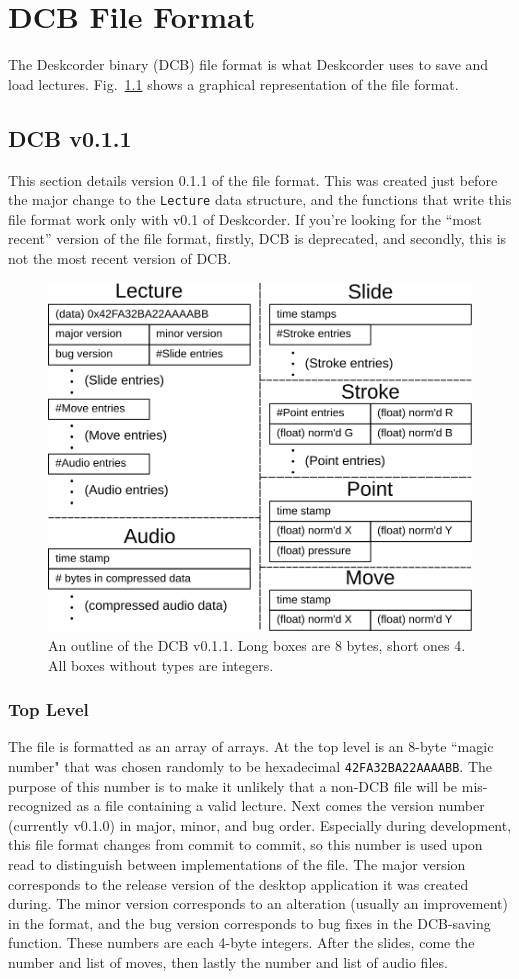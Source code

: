 \chapter{DCB File Format}
The Deskcorder binary (DCB) file format is what Deskcorder uses to save and load lectures.  Fig.~\ref{fig:dcb-ff-v0.1.1} shows a graphical representation of the file format.

\section{DCB v0.1.1}
This section details version 0.1.1 of the file format.  This was created just before the major change to the {\tt Lecture} data structure, and the functions that write this file format work only with v0.1 of Deskcorder.  If you're looking for the ``most recent'' version of the file format, firstly, DCB is deprecated, and secondly, this is not the most recent version of DCB.

\begin{figure}[ht]
  \centering
  \includegraphics[width=.8\columnwidth]{figures/dcb-ff-v0-1-1}
  \caption{An outline of the DCB v0.1.1. Long boxes are 8 bytes, short ones 4. All boxes without types are integers.}
  \label{fig:dcb-ff-v0.1.1}
\end{figure}

\subsection{Top Level}
The file is formatted as an array of arrays.  At the top level is an 8-byte ``magic number" that was chosen randomly to be hexadecimal {\tt 42FA32BA22AAAABB}.  The purpose of this number is to make it unlikely that a non-DCB file will be mis-recognized as a file containing a valid lecture.  Next comes the version number (currently v0.1.0) in major, minor, and bug order.  Especially during development, this file format changes from commit to commit, so this number is used upon read to distinguish between implementations of the file.  The major version corresponds to the release version of the desktop application it was created during. The minor version corresponds to an alteration (usually an improvement) in the format, and the bug version corresponds to bug fixes in the DCB-saving function.  These numbers are each 4-byte integers.  After the slides, come the number and list of moves, then lastly the number and list of audio files.

